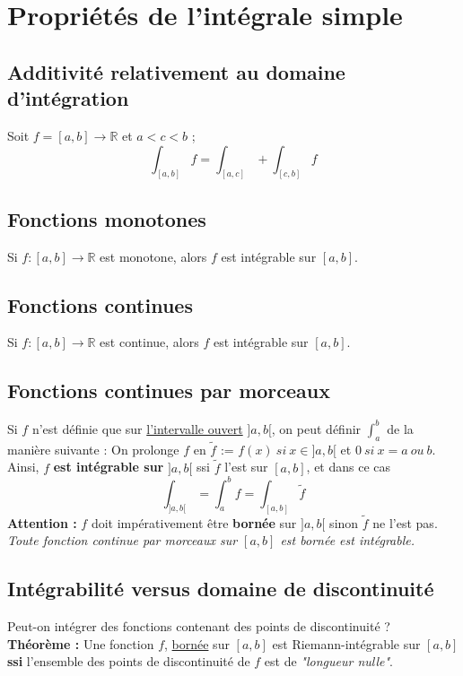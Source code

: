 \documentclass	[11pt, a4paper, openany]{book}
\begin{document}
\section{Propriétés de l'intégrale simple}
\subsection{Additivité relativement au domaine d'intégration}
Soit $f = [a,b] \rightarrow \mathbb{R}$ et $a < c < b$ ;
$$\int_{[a,b]} f = \int_{[a,c]} + \int_{[c,b]} f$$

\subsection{Fonctions monotones}
Si $f : [a,b] \rightarrow \mathbb{R}$ est monotone, alors $f$ est intégrable sur $[a,b]$.

\subsection{Fonctions continues}
Si $f : [a,b] \rightarrow \mathbb{R}$ est continue, alors $f$ est intégrable sur $[a,b]$.

\subsection{Fonctions continues par morceaux}
Si $f$ n'est définie que sur \underline{l'intervalle ouvert} $]a,b[$, on peut définir $\int_a^b$ de la manière suivante : On prolonge $f$ en $\tilde{f}$ := $f(x)\ si\ x \in ]a,b[$ et $0\ si\ x = a\ ou\ b$.\\

Ainsi, $f$ \textbf{est intégrable sur} $]a,b[$ ssi $\tilde{f}$ l'est sur $[a,b]$, et dans ce cas
$$\int_{]a,b[} = \int_a^b f = \int_{[a,b]} \tilde{f}$$
\textbf{Attention :} $f$ doit impérativement être \textbf{bornée} sur $]a,b[$ sinon $\tilde{f}$ ne l'est pas.\\

\textit{Toute fonction continue par morceaux sur $[a,b]$ est bornée est intégrable.}

\subsection{Intégrabilité versus domaine de discontinuité}
Peut-on intégrer des fonctions contenant des points de discontinuité ? \\

\textbf{Théorème :} Une fonction $f$, \underline{bornée} sur $[a,b]$ est Riemann-intégrable sur $[a,b]$ \textbf{ssi} l'ensemble des points de discontinuité de $f$ est de \textit{"longueur nulle"}.
\end{document}
